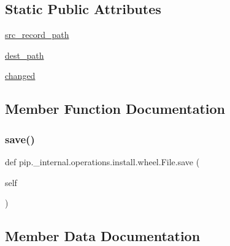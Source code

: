 \subsection*{Static Public Attributes}
\begin{DoxyCompactItemize}
\item 
\hyperlink{classpip_1_1__internal_1_1operations_1_1install_1_1wheel_1_1File_a0adc26f770156f23669c23a37777abf8}{src\+\_\+record\+\_\+path}
\item 
\hyperlink{classpip_1_1__internal_1_1operations_1_1install_1_1wheel_1_1File_a99b4d65d8591976e1921a139890a1efb}{dest\+\_\+path}
\item 
\hyperlink{classpip_1_1__internal_1_1operations_1_1install_1_1wheel_1_1File_a2dd6f4961151aff31a7c54c02eebd1ba}{changed}
\end{DoxyCompactItemize}


\subsection{Member Function Documentation}
\mbox{\label{classpip_1_1__internal_1_1operations_1_1install_1_1wheel_1_1File_ab5a3026615c32c9ef662c56d53596557}} 
\subsubsection{\texorpdfstring{save()}{save()}}
{\footnotesize\ttfamily def pip.\+\_\+internal.\+operations.\+install.\+wheel.\+File.\+save (\begin{DoxyParamCaption}\item[{}]{self }\end{DoxyParamCaption})}



\subsection{Member Data Documentation}
\mbox{\label{classpip_1_1__internal_1_1operations_1_1install_1_1wheel_1_1File_a2dd6f4961151aff31a7c54c02eebd1ba}} 
